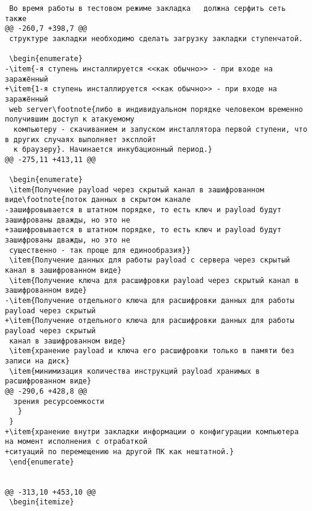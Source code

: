 \begin{verbatim}
 Во время работы в тестовом режиме закладка   должна серфить сеть также
@@ -260,7 +398,7 @@
 структуре закладки необходимо сделать загрузку закладки ступенчатой.

 \begin{enumerate}
-\item{-я ступень инсталлируется <<как обычно>> - при входе на заражённый
+\item{1-я ступень инсталлируется <<как обычно>> - при входе на заражённый
 web server\footnote{либо в индивидуальном порядке человеком временно получившим доступ к атакуемому
  компьютеру - скачиванием и запуском инсталлятора первой ступени, что в других случаях выполняет эксплойт
  к браузеру}. Начинается инкубационный период.}
@@ -275,11 +413,11 @@

 \begin{enumerate}
 \item{Получение payload через скрытый канал в зашифрованном виде\footnote{поток данных в скрытом канале
-зашифровывается в штатном порядке, то есть ключ и payload будут зашифрованы дважды, но это не
+зашифровывается в штатном порядке, то есть ключ и payload будут зашифрованы дважды, но это не
 существенно - так проще для единообразия}}
 \item{Получение данных для работы payload с сервера через скрытый канал в зашифрованном виде}
 \item{Получение ключа для расшифровки payload через скрытый канал в зашифрованном виде}
-\item{Получение отдельного ключа для расшифровки данных для работы payload через скрытый
+\item{Получение отдельного ключа для расшифровки данных для работы payload через скрытый
 канал в зашифрованном виде}
 \item{хранение payload и ключа его расшифровки только в памяти без записи на диск}
 \item{минимизация количества инструкций payload хранимых в расшифрованном виде}
@@ -290,6 +428,8 @@
  зрения ресурсоемкости
   }
 }
+\item{хранение внутри закладки информации о конфигурации компьютера на момент исполнения с отрабаткой
+ситуаций по перемещению на другой ПК как нештатной.}
 \end{enumerate}


@@ -313,10 +453,10 @@
 \begin{itemize}


\end{verbatim}
